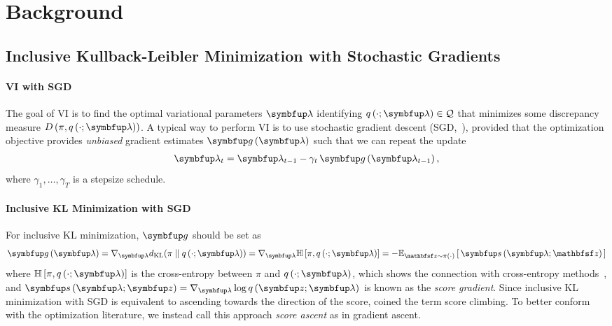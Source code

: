 
\vspace{-2ex}
\section{Background}
\vspace{-2ex}
\subsection{Inclusive Kullback-Leibler Minimization with Stochastic Gradients}\label{section:ivi_previous}
\vspace{-0.05in}
\paragraph{VI with SGD}
The goal of VI is to find the optimal variational parameters \(\vlambda\) identifying \(q\left(\cdot; \vlambda\right) \in \mathcal{Q}\) that minimizes some discrepancy measure \(D\left(\pi, q\left(\cdot; \vlambda\right)\right)\).
A typical way to perform VI is to use stochastic gradient descent (SGD,~\citealt{robbins_stochastic_1951}), provided that the optimization objective provides \textit{unbiased} gradient estimates \(\vg\,(\vlambda)\) such that we can repeat the update
{%
\begin{align*}
  \vlambda_{t} = \vlambda_{t-1} - \gamma_{t} \, \vg\left(\vlambda_{t-1}\right),
\end{align*}
}%
where \(\gamma_1, \ldots, \gamma_T\) is a stepsize schedule.

\vspace{-2ex}
\paragraph{Inclusive KL Minimization with SGD}
For inclusive KL minimization, \(\vg\) should be set as
%
{%
\begin{align*}
  \vg\left(\vlambda\right)
  = \nabla_{\vlambda} \DKL{\pi}{q\left(\cdot; \vlambda\right)}
  = \nabla_{\vlambda} \mathbb{H}\left[\pi, q\left(\cdot; \vlambda\right)\right]
  = -\Esub{\rvvz \sim \pi\left(\cdot\right)}{ \vs\,(\vlambda; \rvvz) } 
\end{align*}
}%
%
where \(\mathbb{H}\left[\pi, q\left(\cdot; \vlambda\right)\right]\) is the cross-entropy between \(\pi\) and \(q\left(\cdot; \vlambda\right)\), which shows the connection with cross-entropy methods~\citep{deboer_tutorial_2005}, and \(\vs\,(\vlambda;\vz) = \nabla_{\vlambda} \log q\,(\vz; \vlambda)\) is known as the \textit{score gradient}.
Since inclusive KL minimization with SGD is equivalent to ascending towards the direction of the score, \citet{NEURIPS2020_b2070693} coined the term score climbing.
To better conform with the optimization literature, we instead call this approach \textit{score ascent} as in gradient ascent.

